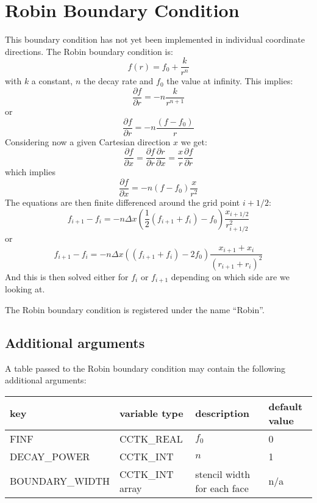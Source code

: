 \documentclass{article}
\begin{document}
\section{Robin Boundary Condition}

This boundary condition has not yet been implemented in 
individual coordinate directions.
The Robin boundary condition is:
\begin{equation}
f(r) = f_0 + \frac{k}{r^n}
\end{equation}
with $k$ a constant, $n$ the decay rate and $f_0$ the value at infinity. This implies:
\begin{equation}
\frac{\partial f}{\partial r} =  - n \frac{k}{r^{n+1}}
\end{equation}
or
\begin{equation}
\frac{\partial f}{\partial r} = - n \frac{(f-f_0)}{r}
\end{equation}
Considering now a given Cartesian direction $x$  we get:
\begin{equation}
\frac{\partial f}{\partial x} =
\frac{\partial f}{\partial r} 
\frac{\partial r}{\partial x} = \frac{x}{r}\frac{\partial f}{\partial r}
\end{equation}
which implies
\begin{equation}
\frac{\partial f}{\partial x} = - n (f-f_0)\frac{x}{r^2}
\end{equation}
The equations are then finite differenced around the grid point $i+1/2$:
\begin{equation}
f_{i+1} - f_i = - n \Delta x \left( \frac{1}{2}(f_{i+1}+f_i) - f_0\right) \frac{x_{i+1/2}}{r^2_{i+1/2}}
\end{equation}
or
\begin{equation}
f_{i+1}-f_i = -n \Delta x ( (f_{i+1}+f_i)-2 f_0)\frac{x_{i+1}+x_i}{(r_{i+1}+r_i)^2}
\end{equation}
And this is then solved either for $f_i$ or $f_{i+1}$ depending on which side are
we looking at.

The Robin boundary condition is registered under the name ``Robin''.


\subsection{Additional arguments}

A table passed to the Robin boundary condition may contain the
following additional arguments:\\[1mm]
\begin{tabular}{|l|l|l|l|}
\hline
\textbf{key} & \textbf{variable type} & \textbf{description} & \textbf{default value}\\
\hline
FINF & CCTK\_REAL & $f_0$ & 0\\
DECAY\_POWER & CCTK\_INT & $n$ & 1\\
BOUNDARY\_WIDTH & CCTK\_INT array & stencil width for each face & n/a\\
\hline
\end{tabular}
\end{document}
